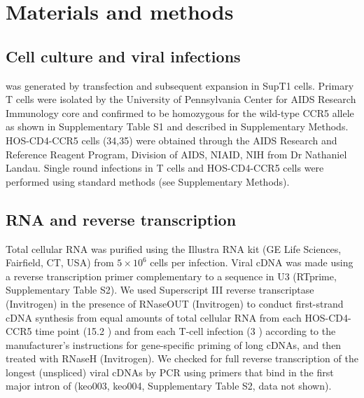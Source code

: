 \documentclass[../sherrill-Mix_thesis.tex]{subfiles}
\begin{document}
\section{Materials and methods}
\subsection{Cell culture and viral infections}
\hivEight{} was generated by transfection and subsequent expansion in SupT1 cells. Primary T cells were isolated by the University of Pennsylvania Center for AIDS Research Immunology core and confirmed to be homozygous for the wild-type CCR5 allele as shown in Supplementary Table S1 and described in Supplementary Methods. HOS-CD4-CCR5 cells (34,35) were obtained through the AIDS Research and Reference Reagent Program, Division of AIDS, NIAID, NIH from Dr Nathaniel Landau. Single round infections in T cells and HOS-CD4-CCR5 cells were performed using standard methods (see Supplementary Methods). 

\subsection{RNA and reverse transcription}
Total cellular RNA was purified using the Illustra RNA kit (GE Life Sciences, Fairfield, CT, USA) from $5 \times 10^6$ cells per infection. Viral cDNA was made using a reverse transcription primer complementary to a sequence in U3 (RTprime, Supplementary Table S2). We used Superscript III reverse transcriptase (Invitrogen) in the presence of RNaseOUT (Invitrogen) to conduct first-strand cDNA synthesis from equal amounts of total cellular RNA from each HOS-CD4-CCR5 time point (15.2 \ug{}) and from each T-cell infection (3 \ug{}) according to the manufacturer's instructions for gene-specific priming of long cDNAs, and then treated with RNaseH (Invitrogen). We checked for full reverse transcription of the longest (unspliced) viral cDNAs by PCR using primers that bind in the first major intron of \hivEight{} (keo003, keo004, Supplementary Table S2, data not shown).
\end{document}

